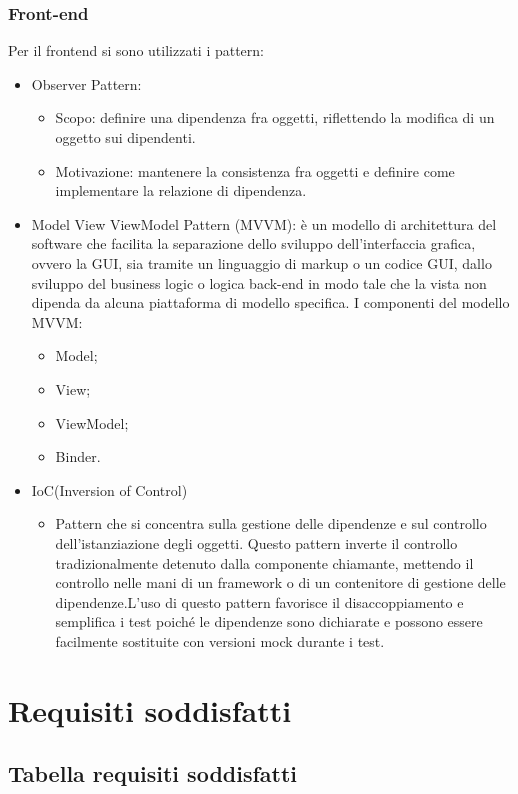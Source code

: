 \documentclass[12pt]{article}
\begin{document}
\subsubsection{Front-end}
Per il frontend si sono utilizzati i pattern:
\begin{itemize}
	\item Observer Pattern:
	\begin{itemize}
		\item Scopo: definire una dipendenza fra oggetti, riflettendo la modifica di un oggetto sui dipendenti.
		\item Motivazione: mantenere la consistenza fra oggetti e definire come implementare la relazione di dipendenza.
	\end{itemize}
	\item Model View ViewModel Pattern (MVVM): è un modello di architettura del software che facilita la separazione dello sviluppo dell'interfaccia grafica, ovvero la GUI,
sia tramite un linguaggio di markup o un codice GUI, dallo sviluppo del business logic o logica back-end in modo tale che la vista non dipenda da alcuna piattaforma di modello specifica.
I componenti del modello MVVM:	
	\begin{itemize}
		\item Model;
		\item View;
		\item ViewModel;
		\item Binder.
	\end{itemize}
\item IoC(Inversion of Control)
	\begin{itemize}
		\item Pattern che si concentra sulla gestione delle dipendenze e sul controllo dell'istanziazione degli oggetti. Questo pattern inverte il controllo tradizionalmente detenuto dalla 				componente chiamante, mettendo il controllo nelle mani di un framework o di un contenitore di gestione delle dipendenze.L'uso di questo pattern favorisce il disaccoppiamento e 				semplifica i test poiché le dipendenze sono dichiarate e possono essere facilmente sostituite con versioni mock durante i test.
	\end{itemize}
\end{itemize}
 	
\section{Requisiti soddisfatti}
\subsection{Tabella requisiti soddisfatti}
\end{document}
